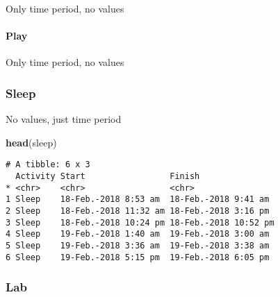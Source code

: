 \documentclass[10,portrait]{article}
\newenvironment{Shaded}{\begin{snugshade}}{\end{snugshade}}
\newcommand{\KeywordTok}[1]{\textcolor[rgb]{0.13,0.29,0.53}{\textbf{#1}}}
\newcommand{\NormalTok}[1]{#1}
\let\oldparagraph\paragraph
\renewcommand{\paragraph}[1]{\oldparagraph{#1}\mbox{}}
\begin{document}
Only time period, no values

\paragraph{Play}\label{play}

Only time period, no values

\subsubsection{Sleep}\label{sleep}

No values, just time period

\begin{Shaded}
\begin{Highlighting}[]
\KeywordTok{head}\NormalTok{(sleep) }
\end{Highlighting}
\end{Shaded}

\begin{verbatim}
# A tibble: 6 x 3
  Activity Start                 Finish               
* <chr>    <chr>                 <chr>                
1 Sleep    18-Feb.-2018 8:53 am  18-Feb.-2018 9:41 am 
2 Sleep    18-Feb.-2018 11:32 am 18-Feb.-2018 3:16 pm 
3 Sleep    18-Feb.-2018 10:24 pm 18-Feb.-2018 10:52 pm
4 Sleep    19-Feb.-2018 1:40 am  19-Feb.-2018 3:00 am 
5 Sleep    19-Feb.-2018 3:36 am  19-Feb.-2018 3:38 am 
6 Sleep    19-Feb.-2018 5:15 pm  19-Feb.-2018 6:05 pm 
\end{verbatim}

\subsubsection{Lab}\label{lab}

\printbibliography
\end{document}
